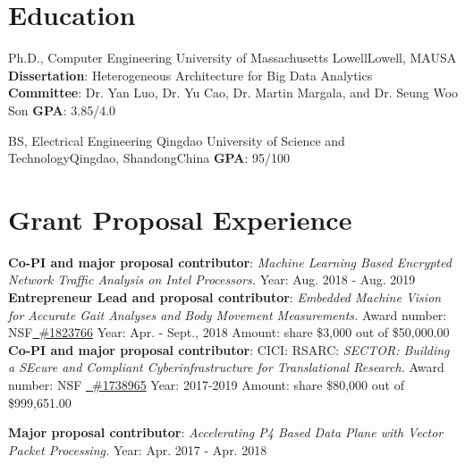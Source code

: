 \documentclass[11pt]{moderncv}
\begin{document}
\pagebreak

\section{Education}
        {Ph.D., Computer Engineering}
        {University of Massachusetts Lowell}{Lowell, MA}{USA}
        {\textbf{Dissertation}: Heterogeneous Architecture for Big Data Analytics\\
         \textbf{Committee}: Dr. Yan Luo, Dr. Yu Cao, Dr. Martin Margala, and Dr. Seung Woo Son
         \textbf{GPA}: 3.85/4.0}  %

        {BS, Electrical Engineering}
        {Qingdao University of Science and Technology}{Qingdao, Shandong}{China}
        {\textbf{GPA}: 95/100        
        }

\section{Grant Proposal Experience}

%
{\textbf{Co-PI and major proposal contributor}: \textit{Machine Learning Based Encrypted Network Traffic Analysis on Intel Processors.} \newline
Year: Aug. 2018 - Aug. 2019
}
%
{\textbf{Entrepreneur Lead and proposal contributor}: \textit{Embedded Machine Vision for Accurate Gait Analyses and Body Movement Measurements.} \newline
Award number: NSF\href{https://nsf.gov/awardsearch/showAward?AWD_ID=1823766}
  {\color{color2}\homepagesymbol~\#1823766} \newline
Year: Apr. - Sept., 2018 \newline
Amount: share \$3,000 out of \$50,000.00
}
%
{\textbf{Co-PI and major proposal contributor}: CICI: RSARC: \textit{SECTOR: Building a {SE}cure and Compliant {C}yberinfrastructure for {T}ranslati{o}nal {R}esearch.} \newline
Award number: NSF \href{https://nsf.gov/awardsearch/showAward?AWD_ID=1738965}
  {\color{color2}\homepagesymbol~\#1738965} \newline
Year: 2017-2019 \newline
Amount: share \$80,000 out of \$999,651.00
}

%
{\textbf{Major proposal contributor}: \textit{Accelerating P4 Based Data Plane with Vector Packet Processing.} \newline
Year: Apr. 2017 - Apr. 2018
}
\end{document}
